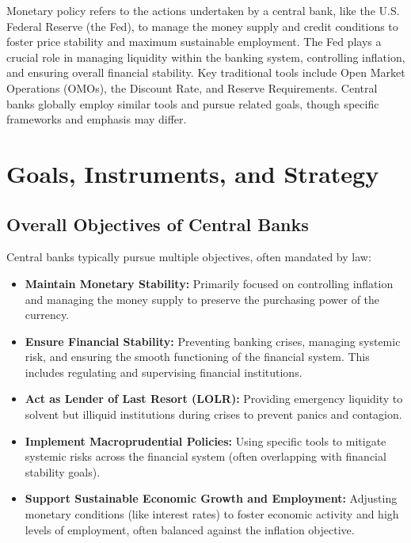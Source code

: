 \newpage 



Monetary policy refers to the actions undertaken by a central bank, like the U.S. Federal Reserve (the Fed), to manage the money supply and credit conditions to foster price stability and maximum sustainable employment. The Fed plays a crucial role in managing liquidity within the banking system, controlling inflation, and ensuring overall financial stability. Key traditional tools include Open Market Operations (OMOs), the Discount Rate, and Reserve Requirements. Central banks globally employ similar tools and pursue related goals, though specific frameworks and emphasis may differ.

\section{Goals, Instruments, and Strategy}

\subsection{Overall Objectives of Central Banks}
Central banks typically pursue multiple objectives, often mandated by law:
\begin{itemize}
    \item \textbf{Maintain Monetary Stability:} Primarily focused on controlling inflation and managing the money supply to preserve the purchasing power of the currency.
    \item \textbf{Ensure Financial Stability:} Preventing banking crises, managing systemic risk, and ensuring the smooth functioning of the financial system. This includes regulating and supervising financial institutions.
    \item \textbf{Act as Lender of Last Resort (LOLR):} Providing emergency liquidity to solvent but illiquid institutions during crises to prevent panics and contagion.
    \item \textbf{Implement Macroprudential Policies:} Using specific tools to mitigate systemic risks across the financial system (often overlapping with financial stability goals).
    \item \textbf{Support Sustainable Economic Growth and Employment:} Adjusting monetary conditions (like interest rates) to foster economic activity and high levels of employment, often balanced against the inflation objective.
\end{itemize}

